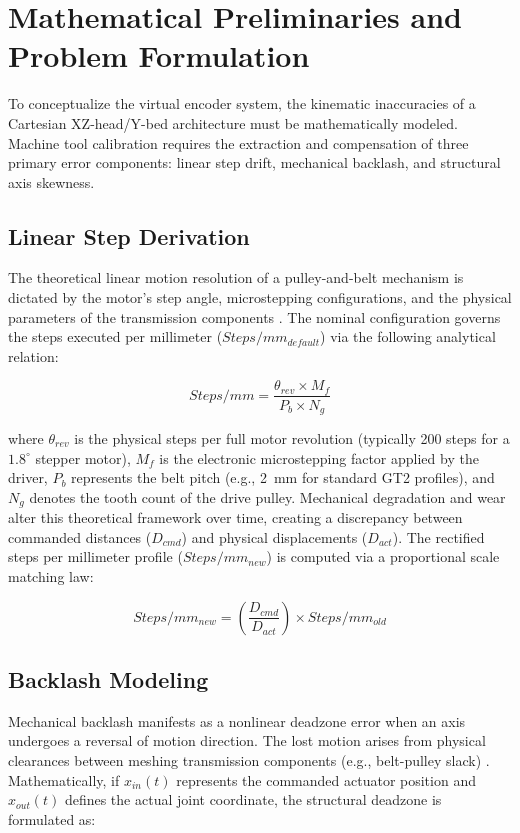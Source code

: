 \section{Mathematical Preliminaries and Problem Formulation}
\label{problem}
To conceptualize the virtual encoder system, the kinematic inaccuracies of a Cartesian XZ-head/Y-bed architecture must be mathematically modeled. Machine tool calibration requires the extraction and compensation of three primary error components: linear step drift, mechanical backlash, and structural axis skewness. 

\subsection{Linear Step Derivation}
The theoretical linear motion resolution of a pulley-and-belt mechanism is dictated by the motor's step angle, microstepping configurations, and the physical parameters of the transmission components \cite{M92}. The nominal configuration governs the steps executed per millimeter ($Steps/mm_{default}$) via the following analytical relation:

\begin{equation}
Steps/mm = \frac{\theta_{rev} \times M_f}{P_b \times N_g}
\end{equation}

where $\theta_{rev}$ is the physical steps per full motor revolution (typically 200 steps for a $1.8^\circ$ stepper motor), $M_f$ is the electronic microstepping factor applied by the driver, $P_b$ represents the belt pitch (e.g., 2~mm for standard GT2 profiles), and $N_g$ denotes the tooth count of the drive pulley. Mechanical degradation and wear alter this theoretical framework over time, creating a discrepancy between commanded distances ($D_{cmd}$) and physical displacements ($D_{act}$). The rectified steps per millimeter profile ($Steps/mm_{new}$) is computed via a proportional scale matching law:

\begin{equation}
Steps/mm_{new} = \left(\frac{D_{cmd}}{D_{act}}\right) \times Steps/mm_{old}
\end{equation}

\subsection{Backlash Modeling}
Mechanical backlash manifests as a nonlinear deadzone error when an axis undergoes a reversal of motion direction. The lost motion arises from physical clearances between meshing transmission components (e.g., belt-pulley slack) \cite{papageorgiou2019}. Mathematically, if $x_{in}(t)$ represents the commanded actuator position and $x_{out}(t)$ defines the actual joint coordinate, the structural deadzone is formulated as:

